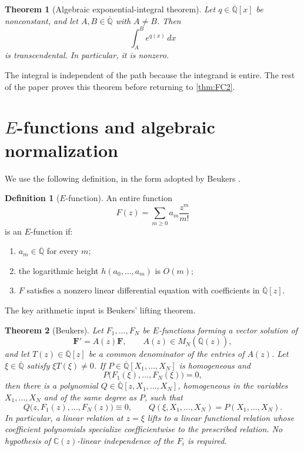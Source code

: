 \documentclass[11pt]{article}
\numberwithin{equation}{section}
\newtheorem{theorem}{Theorem}[section]
\theoremstyle{definition}
\newtheorem{definition}[definition]{Definition}
\theoremstyle{remark}
\newcommand{\C}{\mathbb C}
\newcommand{\Qbar}{\overline{\mathbb Q}}
\begin{document}
\begin{theorem}[Algebraic exponential-integral theorem]\label{thm:exp-integral}
Let $q\in\Qbar[x]$ be nonconstant, and let $A,B\in\Qbar$ with $A\ne B$.
Then
\[
  \int_A^B e^{q(x)}\,dx
\]
is transcendental.  In particular, it is nonzero.
\end{theorem}

The integral is independent of the path because the integrand is entire.
The rest of the paper proves this theorem before returning to
\cref{thm:FC2}.

\section{\texorpdfstring{$E$}{E}-functions and algebraic normalization}\label{sec:E-functions}

We use the following definition, in the form adopted by Beukers \cite[\S1]{Beukers}.

\begin{definition}[$E$-function]\label{def:E}
An entire function
\[
  F(z)=\sum_{m\ge0} a_m\frac{z^m}{m!}
\]
is an $E$-function if:
\begin{enumerate}[label=\textup{(\roman*)},leftmargin=2.2em]
\item $a_m\in\Qbar$ for every $m$;
\item the logarithmic height $h(a_0,\ldots,a_m)$ is $O(m)$;
\item $F$ satisfies a nonzero linear differential equation with coefficients in $\Qbar[z]$.
\end{enumerate}
\end{definition}

The key arithmetic input is Beukers' lifting theorem.

\begin{theorem}[Beukers]\label{thm:Beukers}
Let $F_1,\ldots,F_N$ be $E$-functions forming a vector solution of
\[
  \mathbf F'=A(z)\mathbf F,
  \qquad A(z)\in M_N(\Qbar(z)),
\]
and let $T(z)\in\Qbar[z]$ be a common denominator of the entries of $A(z)$.
Let $\xi\in\Qbar$ satisfy $\xi T(\xi)\ne0$.  If
$P\in\Qbar[X_1,\ldots,X_N]$ is homogeneous and
\[
  P\bigl(F_1(\xi),\ldots,F_N(\xi)\bigr)=0,
\]
then there is a polynomial
$Q\in\Qbar[z,X_1,\ldots,X_N]$, homogeneous in the variables
$X_1,\ldots,X_N$ and of the same degree as $P$, such that
\[
  Q\bigl(z,F_1(z),\ldots,F_N(z)\bigr)\equiv0,
  \qquad
  Q(\xi,X_1,\ldots,X_N)=P(X_1,\ldots,X_N).
\]
In particular, a linear relation at $z=\xi$ lifts to a linear functional
relation whose coefficient polynomials specialize coefficientwise to the
prescribed relation.  No hypothesis of $\C(z)$-linear independence of the
$F_i$ is required.
\end{theorem}
\end{document}
